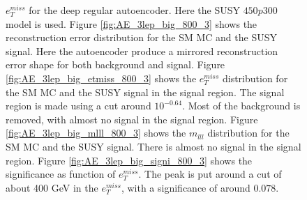 \begin{figure}[H]
{    $e_T^{miss}$ for the deep regular autoencoder. Here the SUSY $450p300$ model is used.
    Figure \ref{fig:AE_3lep_big_800_3} shows the reconstruction error 
    distribution for the SM MC and the SUSY signal. Here the autoencoder produce a mirrored reconstruction error shape for both background and 
    signal. Figure \ref{fig:AE_3lep_big_etmiss_800_3} shows the $e_T^{miss}$ distribution for the SM MC and the SUSY signal in the signal region. 
    The signal region is made using a cut around $10^{-0.64}$. Most of the background is removed, with almost no signal in the signal region.
    Figure \ref{fig:AE_3lep_big_mlll_800_3} shows the $m_{lll}$ distribution for the SM MC and the SUSY signal. 
    There is almost no signal in the signal region. Figure \ref{fig:AE_3lep_big_signi_800_3} shows the significance as function of
    $e_T^{miss}$. The peak is put around a cut of about 400 GeV in the $e_T^{miss}$, with a significance of around $0.078$.}
    \label{fig:AE_3lep_big_rec_sig_signi_800_3}
\end{figure}

